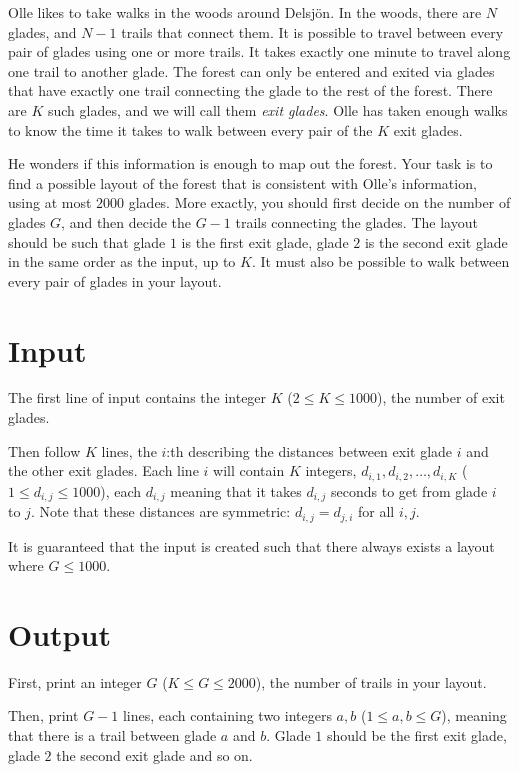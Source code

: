 \noindent

Olle likes to take walks in the woods around Delsjön. In the woods, there are $N$ glades, and $N-1$
trails that connect them. It is possible to travel between every pair of glades using one or more trails.
It takes exactly one minute to travel along one trail to another glade. 
The forest can only be entered and exited via glades that have exactly one trail connecting the glade
to the rest of the forest. There are $K$ such glades, and we will call them \textit{exit glades}.
Olle has taken enough walks to know the time it takes to walk between every pair of the $K$ exit glades.

He wonders if this information is enough to map out the forest. Your task is to find a possible layout of the
forest that is consistent with Olle's information, using at most $2000$ glades. More exactly, you should first
decide on the number of glades $G$, and then decide the $G-1$ trails connecting the glades. The layout should
be such that glade $1$ is the first exit glade, glade $2$ is the second exit glade in the same order as the input, up to $K$.
It must also be possible to walk between every pair of glades in your layout.

\section*{Input}
The first line of input contains the integer $K$ ($2 \leq K \leq 1000$), the number of exit glades.

Then follow $K$ lines, the $i$:th describing the distances between exit glade $i$ and the other exit glades. Each line $i$ will contain
$K$ integers, $d_{i,1}, d_{i,2}, \dots, d_{i,K}$ ($1 \leq d_{i,j} \leq 1000$), each $d_{i,j}$ meaning that it takes $d_{i,j}$ 
seconds to get from glade $i$ to $j$. Note that these distances are symmetric: $d_{i,j}=d_{j,i}$ for all $i,j$.

It is guaranteed that the input is created such that there always exists a layout where $G \leq 1000$.

\section*{Output}
First, print an integer $G$ ($K \leq G \leq 2000$), the number of trails in your layout.

Then, print $G-1$ lines, each containing two integers $a,b$ ($1 \leq a,b \leq G$), meaning that there
is a trail between glade $a$ and $b$. Glade $1$ should be the first exit glade, glade $2$ the second
exit glade and so on.

